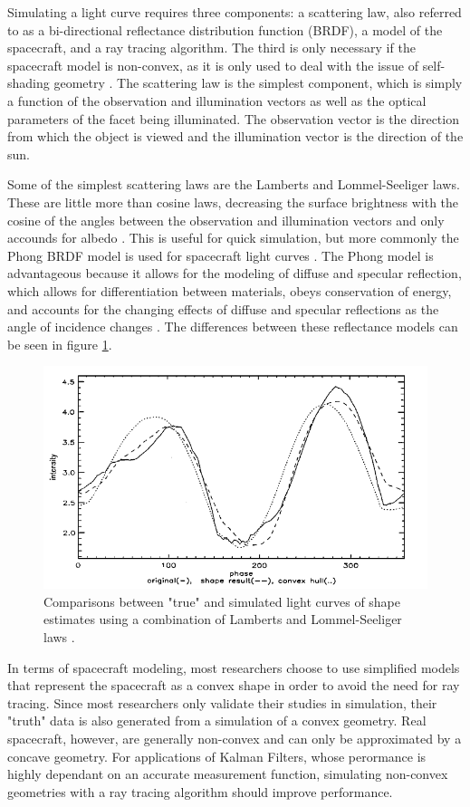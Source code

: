\documentclass{article}
\begin{document}
Simulating a light curve requires three components: a scattering law, also referred to as a bi-directional reflectance distribution function (BRDF), a model of the spacecraft, and a ray tracing algorithm. The third is only necessary if the spacecraft model is non-convex, as it is only used to deal with the issue of self-shading geometry \cite{Kaasalainen}. The scattering law is the simplest component, which is simply a function of the observation and illumination vectors as well as the optical parameters of the facet being illuminated. The observation vector is the direction from which the object is viewed and the illumination vector is the direction of the sun.

Some of the simplest scattering laws are the Lamberts and Lommel-Seeliger laws. These are little more than cosine laws, decreasing the surface brightness with the cosine of the angles between the observation and illumination vectors and only accounds for albedo \cite{Kaasalainen} \cite{Bradley2014LIGHTCURVEIF}. This is useful for quick simulation, but more commonly the Phong BRDF model is used for spacecraft light curves \cite{StateAndParameter} \cite{SpaceObjectCharacterization} \cite{LINARES20141}. The Phong model is advantageous because it allows for the modeling of diffuse and specular reflection, which allows for differentiation between materials, obeys conservation of energy, and accounts for the changing effects of diffuse and specular reflections as the angle of incidence changes \cite{Ashikhmin}. The differences between these reflectance models can be seen in figure \ref{brdf_comparisons_im}.

\begin{figure}[h]
	\centering
	\includegraphics[width=.5\textwidth]{lightcurve_simulation}
	\caption{Comparisons between "true" and simulated light curves of shape estimates using a combination of Lamberts and Lommel-Seeliger laws \cite{Kaasalainen}.}
	\label{brdf_comparisons_im}
\end{figure}

In terms of spacecraft modeling, most researchers choose to use simplified models that represent the spacecraft as a convex shape in order to avoid the need for ray tracing. Since most researchers only validate their studies in simulation, their "truth" data is also generated from a simulation of a convex geometry. Real spacecraft, however, are generally non-convex and can only be approximated by a concave geometry. For applications of Kalman Filters, whose perormance is highly dependant on an accurate measurement function, simulating non-convex geometries with a ray tracing algorithm should improve performance.
\end{document}
